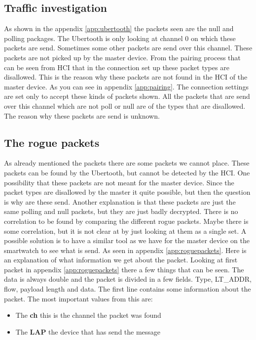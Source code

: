 \subsection{Traffic investigation}
As shown in the appendix \ref{app:ubertooth} the packets seen are the null and polling packages. The Ubertooth is only looking at channel 0 on which these packets are send. Sometimes some other packets are send over this channel. These packets are not picked up by the master device. From the pairing process that can be seen from HCI that in the connection set up these packet types are disallowed. This is the reason why these packets are not found in the HCI of the master device. As you can see in appendix \ref{app:pairing}. The connection settings are set only to accept these kinds of packets shown. All the packets that are send over this channel which are not poll or null are of the types that are disallowed. \pend
The reason why these packets are send is unknown.
\subsection{The rogue packets}
As already mentioned the packets there are some packets we cannot place. These packets can be found by the Ubertooth, but cannot be detected by the HCI. One possibility that these packets are not meant for the master device. Since the packet types are disallowed by the master it quite possible, but then the question is why are these send. Another explanation is that these packets are just the same polling and null packets, but they are just badly decrypted. There is no correlation to be found by comparing the different rogue packets. Maybe there is some correlation, but it is not clear at by just looking at them as a single set. A possible solution is to have a similar tool as we have for the master device on the smartwatch to see what is send. As seen in appendix \ref{app:roguepackets}. Here is an explanation of what information we get about the packet.
Looking at first packet in appendix \ref{app:roguepackets} there a few things that can be seen. The data is always double and the packet is divided in a few fields. Type, LT\_ADDR, flow, payload length and data. The first line contains some information about the packet. The most important values from this are:
\begin{itemize} 
\item The \textbf{ch} this is the channel the packet was found 
\item The \textbf{LAP} the device that has send the message
\end{itemize}
